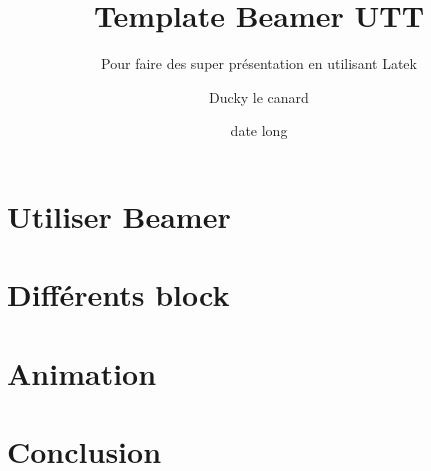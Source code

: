 \documentclass[A4,svgnames,9pt,aspectratio=169]{beamer}
\title[titrecourt]{Template Beamer UTT}
\subtitle{Pour faire des super présentation en utilisant Latek}
\date[00/00/202X]{date long}
\author[A. et al.]{Ducky le canard}
\begin{document}
\frame{\titlepage}

\renewcommand{\contentsname}{Sommaire}

\section{Utiliser Beamer}


\section{Différents block}


\section{Animation}




\section{Conclusion}



\frame{\merci}

\end{document}
